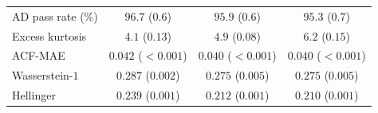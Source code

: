 \begin{table}[H]
\begin{tabular}{@{}lccc@{}}
AD pass rate (\%)   & $\mathbf{96.7}$ ($0.6$) &  $95.9$ ($0.6$)         &  $95.3$ ($0.7$) \\
Excess kurtosis     &   $4.1$ ($0.13$)        &   $4.9$ ($0.08$)        & $\mathbf{6.2}$ ($0.15$) \\
ACF-MAE             & $0.042$ ($<\!0.001$)    & $\mathbf{0.040}$ ($<\!0.001$) & $\mathbf{0.040}$ ($<\!0.001$) \\
Wasserstein-$1$     & $0.287$ ($0.002$)       & $\mathbf{0.275}$ ($0.005$) & $\mathbf{0.275}$ ($0.005$) \\
Hellinger           & $0.239$ ($0.001$)       & $0.212$ ($0.001$)       & $\mathbf{0.210}$ ($0.001$) \\
\bottomrule
\end{tabular}
\end{table}


\begin{table}[H]
  \centering
  \caption{\textbf{Hybrid composition method broken out by branch.}
    $N_{\mathrm{tickers}}$: number of tickers assigned to each branch by
    the $R^2_{\mathrm{preserve}} = 0.80$ threshold. The clipped
    variance-preserving branch does not trigger anywhere in the
    universe ($\rho_i < 0.90$ for all tickers) and is omitted. The
    two trackers in the $R^2$-preserving branch (QQQ and SPYG) had
    median absolute errors of $0.005$ for $\beta$ and $0.001$ for
    $R^2$, with a KS pass rate of $100\%$.}
  \label{tab:branch}
  \small
  
\end{table}


